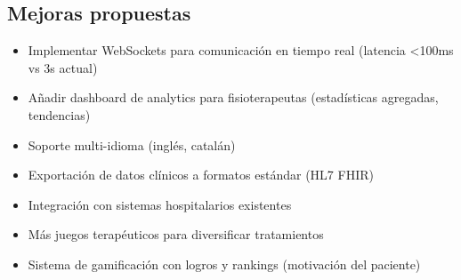 \subsection{Mejoras propuestas}

\begin{itemize}
    \item Implementar WebSockets para comunicación en tiempo real (latencia <100ms vs 3s actual)
    \item Añadir dashboard de analytics para fisioterapeutas (estadísticas agregadas, tendencias)
    \item Soporte multi-idioma (inglés, catalán)
    \item Exportación de datos clínicos a formatos estándar (HL7 FHIR)
    \item Integración con sistemas hospitalarios existentes
    \item Más juegos terapéuticos para diversificar tratamientos
    \item Sistema de gamificación con logros y rankings (motivación del paciente)
\end{itemize}
